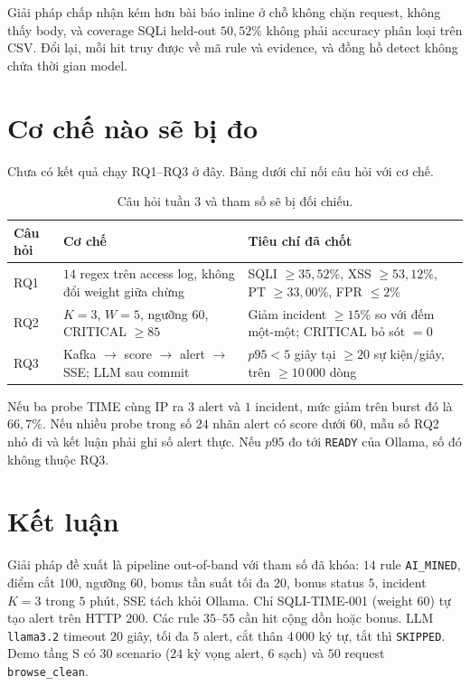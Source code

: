 \documentclass[a4paper,11pt]{article}
\begin{document}
Giải pháp chấp nhận kém hơn bài báo inline ở chỗ không chặn request, không thấy body, và coverage SQLi held-out $50{,}52\%$ không phải accuracy phân loại trên CSV. Đổi lại, mỗi hit truy được về mã rule và evidence, và đồng hồ detect không chứa thời gian model.

\section{Cơ chế nào sẽ bị đo}

Chưa có kết quả chạy RQ1--RQ3 ở đây. Bảng dưới chỉ nối câu hỏi với cơ chế.

\begin{table}[ht]
\centering
\caption{Câu hỏi tuần 3 và tham số sẽ bị đối chiếu.}
\label{tab:rq}
\small
\begin{tabularx}{\linewidth}{@{}p{1.5cm}Y Y@{}}
\toprule
Câu hỏi & Cơ chế & Tiêu chí đã chốt \\
\midrule
RQ1 & $14$ regex trên access log, không đổi weight giữa chừng & SQLI $\geq 35{,}52\%$, XSS $\geq 53{,}12\%$, PT $\geq 33{,}00\%$, FPR $\leq 2\%$ \\
RQ2 & $K{=}3$, $W{=}5$, ngưỡng $60$, CRITICAL $\geq 85$ & Giảm incident $\geq 15\%$ so với đếm một-một; CRITICAL bỏ sót $= 0$ \\
RQ3 & Kafka $\rightarrow$ score $\rightarrow$ alert $\rightarrow$ SSE; LLM sau commit & $p95 < 5$ giây tại $\geq 20$ sự kiện/giây, trên $\geq 10\,000$ dòng \\
\bottomrule
\end{tabularx}
\end{table}

Nếu ba probe TIME cùng IP ra $3$ alert và $1$ incident, mức giảm trên burst đó là $66{,}7\%$. Nếu nhiều probe trong số $24$ nhãn alert có score dưới $60$, mẫu số RQ2 nhỏ đi và kết luận phải ghi số alert thực. Nếu $p95$ đo tới \texttt{READY} của Ollama, số đó không thuộc RQ3.

\section{Kết luận}

Giải pháp đề xuất là pipeline out-of-band với tham số đã khóa: $14$ rule \texttt{AI\_MINED}, điểm cắt $100$, ngưỡng $60$, bonus tần suất tối đa $20$, bonus status $5$, incident $K{=}3$ trong $5$ phút, SSE tách khỏi Ollama. Chỉ SQLI-TIME-001 (weight $60$) tự tạo alert trên HTTP $200$. Các rule $35$--$55$ cần hit cộng dồn hoặc bonus. LLM \texttt{llama3.2} timeout $20$ giây, tối đa $5$ alert, cắt thân $4\,000$ ký tự, tắt thì \texttt{SKIPPED}. Demo tầng S có $30$ scenario ($24$ kỳ vọng alert, $6$ sạch) và $50$ request \texttt{browse\_clean}.
\end{document}
